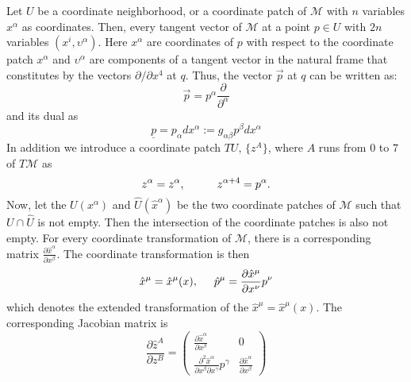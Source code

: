 Let $U$ be a coordinate neighborhood, or a coordinate patch of $\mathcal{M}$ with $n$ variables $x^{\alpha}$ as coordinates. 
Then, every tangent vector of $\mathcal{M}$ at a point $p\in U$ with $2n$ variables $(x^i,\upsilon^{\alpha})$. 
Here $x^{\alpha}$ are coordinates of $p$ with respect to the coordinate patch ${x^{\alpha}}$ and $\upsilon^{\alpha}$ 
are components of a tangent vector in the natural frame that constitutes by the vectors $\partial/\partial x^4$ at $q$. 
Thus, the vector $\vec{p}$ at $q$ can be written as:
%
\begin{equation}
\vec{p} = p^{\alpha}\frac{\partial}{\partial^{\alpha}}
\end{equation}
%
and its dual as 
%
\begin{equation}
\underline{p} = p_{\alpha}dx^{\alpha}:=g_{\alpha\beta}p^{\beta}dx^{\alpha}
\end{equation}
%
In addition we introduce a coordinate patch $TU$, $\{z^A\}$, where $A$ runs from $0$ to $7$ of $T\mathcal{M}$ as 
%
\begin{equation}
z^{\alpha} = z^{\alpha}, \hspace{10mm} z^{\alpha+4} = p^{\alpha}.
\end{equation}
%
Now, let the $U(x^{\alpha})$ and $\hat{U}(\hat{x}^{\alpha})$ be the two coordinate patches of 
$\mathcal{M}$ such that $U\cap\hat{U}$ is not empty. Then the intersection of the coordinate patches is also not empty. 
%
For every coordinate transformation of $\mathcal{M}$, there is a corresponding matrix 
$\frac{\partial \hat{x}^{\alpha}}{\partial x^{\beta}}$.
%
The coordinate transformation is then
%
\begin{equation}
\hat{x}^{\mu} = \hat{x}^{\mu}(x), \hspace{5mm} \hat{p}^{\mu} = \frac{\partial\hat{x}^{\mu}}{\partial x^{\nu}}p^{\nu}
\end{equation}
%
which denotes the extended transformation of the $\hat{x}^{\mu} = \hat{x}^{\mu}(x)$. 
%
The corresponding Jacobian matrix is 
\begin{equation}
\frac{\partial\hat{z}^A}{\partial z^B} = 
\begin{pmatrix}
\frac{\partial\hat{x}^{\alpha}}{\partial x^{\beta}} & 0 \\
\frac{\partial^2\hat{x}^{\alpha}}{\partial x^{\beta} \partial x^{\gamma}}p^{\gamma} & \frac{\partial\hat{x}^{\alpha}}{\partial x^{\beta}} 
\end{pmatrix}
\end{equation}




